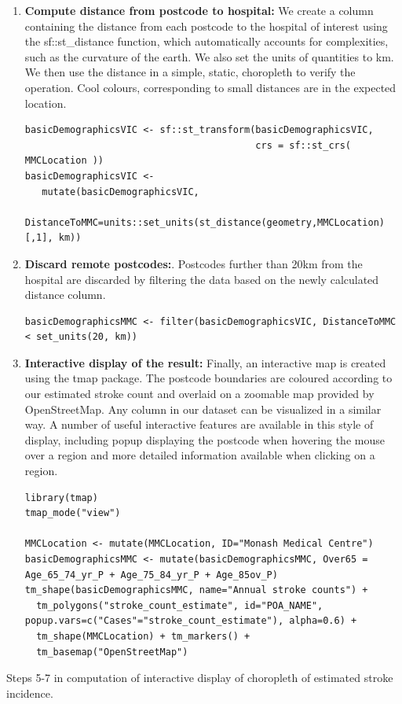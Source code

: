 \documentclass[utf8]{frontiersHLTH}
\begin{document}
\begin{table}[h]
\begin{center}
  \sffamily
  \tiny
\begin{mdframed}[backgroundcolor=blue!20]
\begin{enumerate}
  \def\labelenumi{\arabic{enumi}.}
  \setcounter{enumi}{4}
\item
  {\bf Compute distance from postcode to hospital:} We create a column
  containing the distance from each postcode to the hospital of interest
  using the sf::st\_distance function, which automatically accounts for
  complexities, such as the curvature of the earth. We also set the
  units of quantities to km. We then use the distance in a simple,
  static, choropleth to verify the operation. Cool colours,
  corresponding to small distances are in the expected location.
\begin{lstlisting}
basicDemographicsVIC <- sf::st_transform(basicDemographicsVIC, 
                                         crs = sf::st_crs( MMCLocation ))
basicDemographicsVIC <- 
   mutate(basicDemographicsVIC, 
          DistanceToMMC=units::set_units(st_distance(geometry,MMCLocation)[,1], km))
\end{lstlisting}
\item
  {\bf Discard remote postcodes:}. Postcodes further than 20km from the
  hospital are discarded by filtering the data based on the newly
  calculated distance column.
\begin{lstlisting}
basicDemographicsMMC <- filter(basicDemographicsVIC, DistanceToMMC < set_units(20, km))
\end{lstlisting}
\item
  {\bf Interactive display of the result:} Finally, an interactive map is
  created using the tmap package. The postcode boundaries are coloured
  according to our estimated stroke count and overlaid on a zoomable map
  provided by OpenStreetMap. Any column in our dataset can be visualized
  in a similar way. A number of useful interactive features are
  available in this style of display, including popup displaying the
  postcode when hovering the mouse over a region and more detailed
  information available when clicking on a region.
\begin{lstlisting}
library(tmap)
tmap_mode("view")

MMCLocation <- mutate(MMCLocation, ID="Monash Medical Centre")
basicDemographicsMMC <- mutate(basicDemographicsMMC, Over65 = Age_65_74_yr_P + Age_75_84_yr_P + Age_85ov_P)
tm_shape(basicDemographicsMMC, name="Annual stroke counts") + 
  tm_polygons("stroke_count_estimate", id="POA_NAME", popup.vars=c("Cases"="stroke_count_estimate"), alpha=0.6) + 
  tm_shape(MMCLocation) + tm_markers() + 
  tm_basemap("OpenStreetMap")
\end{lstlisting}

\end{enumerate}
\end{mdframed}
\end{center}
\caption{Steps 5-7 in computation of interactive display of choropleth of
  estimated stroke incidence. \label{tab:exampleA2}}
\end{table}
\end{document}

